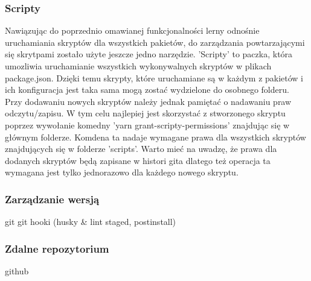 \subsubsection{Scripty}
Nawiązując do poprzednio omawianej funkcjonalności lerny odnośnie uruchamiania skryptów dla wszystkich pakietów, do zarządzania powtarzającymi się skrytpami zostało użyte jeszcze jedno narzędzie. 'Scripty' to paczka, która umozliwia uruchamianie wszystkich wykonywalnych skryptów w plikach package.json. Dzięki temu skrypty, które uruchamiane są w każdym z pakietów i ich konfiguracja jest taka sama mogą zostać wydzielone do osobnego folderu. Przy dodawaniu nowych skryptów należy jednak pamiętać o nadawaniu praw odczytu/zapisu. W tym celu najlepiej jest skorzystać z stworzonego skryptu poprzez wywołanie komedny 'yarn grant-scripty-permissions' znajdując się w głównym folderze. Komdena ta nadaje wymagane prawa dla wszystkich skryptów znajdujących się w folderze 'scripts'. Warto mieć na uwadzę, że prawa dla dodanych skryptów będą zapisane w histori gita dlatego też operacja ta wymagana jest tylko jednorazowo dla każdego nowego skryptu.

\subsubsection{Zarządzanie wersją}



git
git hooki (husky \& lint staged, postinstall)

\subsubsection{Zdalne repozytorium}
github
